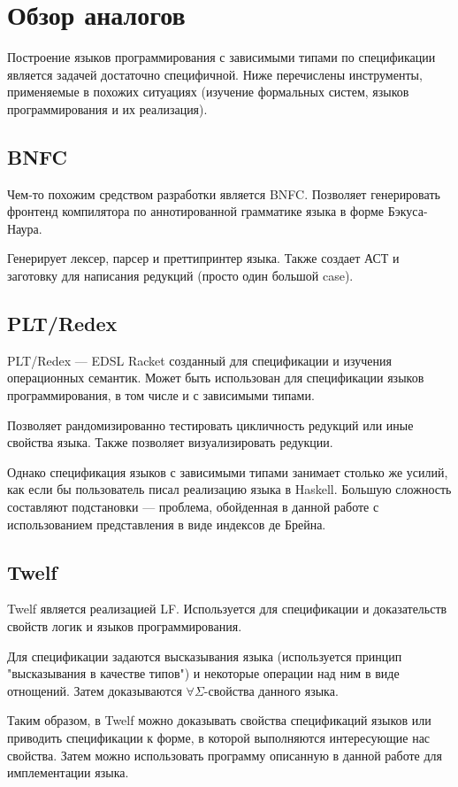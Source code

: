 \section{Обзор аналогов}
Построение языков программирования с зависимыми типами по спецификации является задачей достаточно специфичной. Ниже перечислены инструменты, применяемые в похожих ситуациях (изучение формальных систем, языков программирования и их реализация).

\subsection{BNFC}
Чем-то похожим средством разработки является BNFC\cite{bnfc}. Позволяет генерировать фронтенд компилятора по аннотированной грамматике языка в форме Бэкуса-Наура\cite{lbnf}.

Генерирует лексер, парсер и преттипринтер языка. Также создает АСТ и заготовку для написания редукций (просто один большой case).

\subsection{PLT/Redex}
PLT/Redex\cite{plt:redex} --- EDSL Racket созданный для спецификации и изучения операционных семантик. Может быть использован для спецификации языков программирования, в том числе и с зависимыми типами.

Позволяет рандомизированно тестировать цикличность редукций или иные свойства языка. Также позволяет визуализировать редукции.

Однако спецификация языков с зависимыми типами занимает столько же усилий, как если бы пользователь писал реализацию языка в Haskell\cite{plt:ex}. Большую сложность составляют подстановки --- проблема, обойденная в данной работе с использованием представления в виде индексов де Брейна.

\subsection{Twelf}
Twelf\cite{twelf} является реализацией LF\cite{Pfenning2002}. Используется для спецификации и доказательств свойств логик и языков программирования.

Для спецификации задаются высказывания языка (используется принцип "высказывания в качестве типов"\cite{harper:1993}) и некоторые операции над ним в виде отнощений. Затем доказываются  $\forall\Sigma$-свойства данного языка.

Таким образом, в Twelf можно доказывать свойства спецификаций языков или приводить спецификации к форме, в которой выполняются интересующие нас свойства. Затем можно использовать программу описанную в данной работе для имплементации языка.






